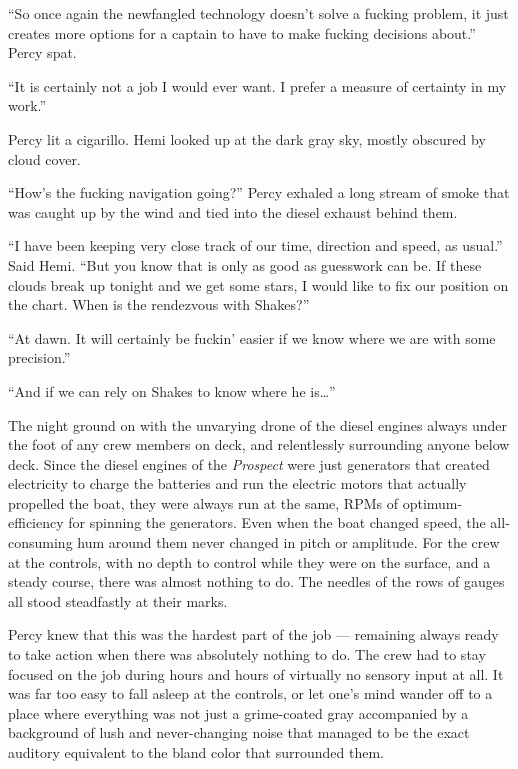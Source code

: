 \documentclass[
]{scrbook}
\begin{document}
``So once again the newfangled technology doesn't solve a fucking
problem, it just creates more options for a captain to have to make
fucking decisions about.'' Percy spat.

``It is certainly not a job I would ever want. I prefer a measure of
certainty in my work.''

Percy lit a cigarillo. Hemi looked up at the dark gray sky, mostly
obscured by cloud cover.

``How's the fucking navigation going?'' Percy exhaled a long stream of
smoke that was caught up by the wind and tied into the diesel exhaust
behind them.

``I have been keeping very close track of our time, direction and speed,
as usual.'' Said Hemi. ``But you know that is only as good as guesswork
can be. If these clouds break up tonight and we get some stars, I would
like to fix our position on the chart. When is the rendezvous with
Shakes?''

``At dawn. It will certainly be fuckin' easier if we know where we are
with some precision.''

``And if we can rely on Shakes to know where he is\ldots{}''

The night ground on with the unvarying drone of the diesel engines
always under the foot of any crew members on deck, and relentlessly
surrounding anyone below deck. Since the diesel engines of the
\emph{Prospect} were just generators that created electricity to charge
the batteries and run the electric motors that actually propelled the
boat, they were always run at the same, RPMs of optimum-efficiency for
spinning the generators. Even when the boat changed speed, the
all-consuming hum around them never changed in pitch or amplitude. For
the crew at the controls, with no depth to control while they were on
the surface, and a steady course, there was almost nothing to do. The
needles of the rows of gauges all stood steadfastly at their marks.

Percy knew that this was the hardest part of the job --- remaining
always ready to take action when there was absolutely nothing to do. The
crew had to stay focused on the job during hours and hours of virtually
no sensory input at all. It was far too easy to fall asleep at the
controls, or let one's mind wander off to a place where everything was
not just a grime-coated gray accompanied by a background of lush and
never-changing noise that managed to be the exact auditory equivalent to
the bland color that surrounded them.
\end{document}
